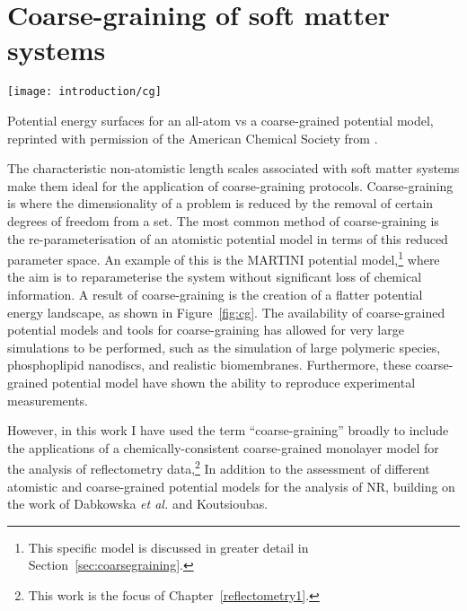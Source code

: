 \section{Coarse-graining of soft matter systems}
%
\begin{marginfigure}
    \texttt{[image: introduction/cg]}
    \caption{Potential energy surfaces for an all-atom vs a coarse-grained potential model, reprinted with permission of the American Chemical Society from \cite{kmiecik_coarse-grained_2016}.}
    \label{fig:cg}
\end{marginfigure}
%
The characteristic non-atomistic length scales associated with soft matter systems make them ideal for the application of coarse-graining protocols.
Coarse-graining is where the dimensionality of a problem is reduced by the removal of certain degrees of freedom from a set.
The most common method of coarse-graining is the re-parameterisation of an atomistic potential model in terms of this reduced parameter space.
An example of this is the MARTINI potential model,\footnote{This specific model is discussed in greater detail in Section~\ref{sec:coarsegraining}.} where the aim is to reparameterise the system without significant loss of chemical information.\autocite{marrink_martini_2007}
A result of coarse-graining is the creation of a flatter potential energy landscape, as shown in Figure~\ref{fig:cg}.
The availability of coarse-grained potential models and tools for coarse-graining has allowed for very large simulations to be performed, such as the simulation of large polymeric species,\autocite{carbone_transferability_2008} phosphoplipid nanodiscs,\autocite{xue_molecular_2018} and realistic biomembranes.\autocite{marrink_computational_2019}
Furthermore, these coarse-grained potential model have shown the ability to reproduce experimental measurements.\autocite{negro_experimental_2014,nawaz_interactions_2012}

However, in this work I have used the term ``coarse-graining'' broadly to include the applications of a chemically-consistent coarse-grained monolayer model for the analysis of reflectometry data,\footnote{This work is the focus of Chapter~\ref{reflectometry1}.}
In addition to the assessment of different atomistic and coarse-grained potential models for the analysis of NR, building on the work of Dabkowska \emph{et al.} and Koutsioubas.\autocite[][see Chapter~\ref{reflectometry2}]{dabkowska_modulation_2014,koutsioubas_combined_2016}

